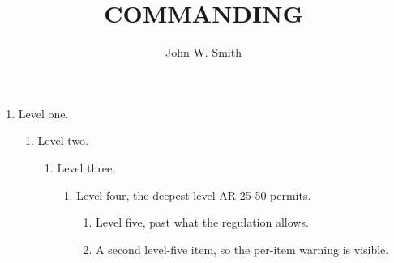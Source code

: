 \documentclass{../armymemo}
\author{John W. Smith}\rank{CPT}\branch{CY}
\title{COMMANDING}
\begin{document}
\begin{enumerate}
	\item Level one.
	      \begin{enumerate}
		      \item Level two.
		            \begin{enumerate}
			            \item Level three.
			                  \begin{enumerate}
				                  \item Level four, the deepest level AR 25-50 permits.
				                        \begin{enumerate}
					                        \item Level five, past what the regulation allows.
					                        \item A second level-five item, so the per-item warning is visible.
				                        \end{enumerate}
			                  \end{enumerate}
		            \end{enumerate}
	      \end{enumerate}
\end{enumerate}
\end{document}

